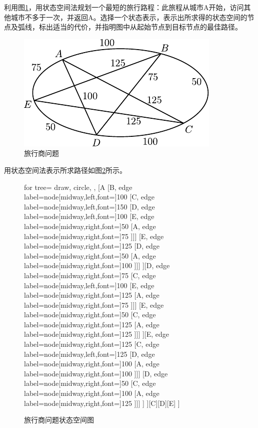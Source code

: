 \begin{question}
利用图\ref{Fig:TSP-problem}，用状态空间法规划一个最短的旅行路程：此旅程从城市A开始，访问其他城市不多于一次，并返回A。选择一个状态表示，表示出所求得的状态空间的节点及弧线，标出适当的代价，并指明图中从起始节点到目标节点的最佳路径。
	\begin{figure}[h]
		\centering
		\includegraphics{figures/ques-2.3.pdf}
		\caption{旅行商问题} \label{Fig:TSP-problem}
	\end{figure}
\end{question}
\begin{solution}
用状态空间法表示所求路径如图\ref{Fig:TSP-answer}所示。
	\begin{figure} [h]
		\centering
		\begin{forest}
		  for tree={
		    draw,
		    circle,
		  },
		  [A
		  	[B, edge label={node[midway,left,font=\scriptsize]{100}}
		  		[C, edge label={node[midway,left,font=\scriptsize]{150}}
		  			[D, edge label={node[midway,left,font=\scriptsize]{100}}
		  				[E, edge label={node[midway,right,font=\scriptsize]{50}}
		  					[A, edge label={node[midway,right,font=\scriptsize]{75}}
		  					]]]
		  			[E, edge label={node[midway,right,font=\scriptsize]{125}}
		  				[D, edge label={node[midway,right,font=\scriptsize]{50}}
		  					[A, edge label={node[midway,right,font=\scriptsize]{100}}
		  					]]]
		  		][D, edge label={node[midway,right,font=\scriptsize]{75	}}
		  			[C, edge label={node[midway,left,font=\scriptsize]{100}}
		  				[E, edge label={node[midway,right,font=\scriptsize]{125}}
		  					[A, edge label={node[midway,right,font=\scriptsize]{75}}
		  					]]]
		  			[E, edge label={node[midway,right,font=\scriptsize]{50}}
		  				[C, edge label={node[midway,right,font=\scriptsize]{125}}
		  					[A, edge label={node[midway,right,font=\scriptsize]{125}}
		  					]]]
		  		][E, edge label={node[midway,right,font=\scriptsize]{125}}
					[C, edge label={node[midway,left,font=\scriptsize]{125}}
						[D, edge label={node[midway,right,font=\scriptsize]{100}}
							[A, edge label={node[midway,right,font=\scriptsize]{100}}
							]]]
					[D, edge label={node[midway,right,font=\scriptsize]{50}}
						[C, edge label={node[midway,right,font=\scriptsize]{100}}
							[A, edge label={node[midway,right,font=\scriptsize]{125}}
							]]]  		
		  		]
		  	][C][D][E]
		  ]
		\end{forest}
		\caption{旅行商问题状态空间图} \label{Fig:TSP-answer}
	\end{figure}
\end{solution}

